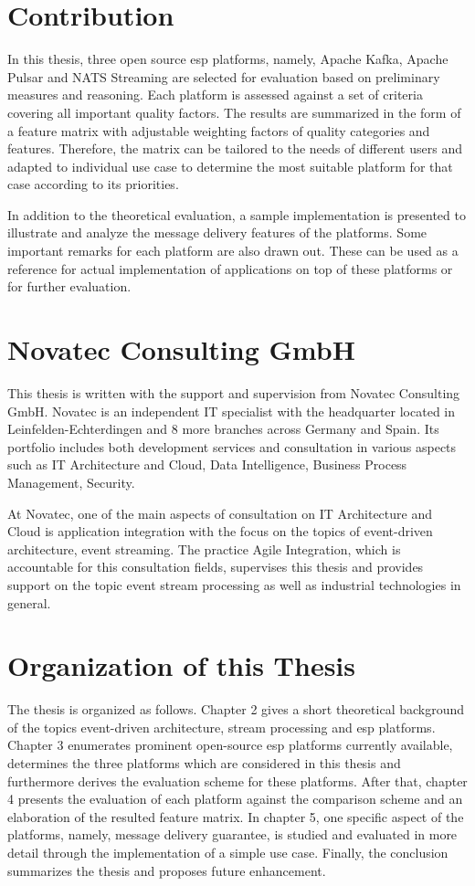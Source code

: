 \section{Contribution}
In this thesis, three open source \acrshort{esp} platforms, namely, Apache Kafka, Apache Pulsar and NATS Streaming are selected for evaluation based on preliminary measures and reasoning. Each platform is assessed against a set of criteria covering all important quality factors. The results are summarized in the form of a feature matrix with adjustable weighting factors of quality categories and features. Therefore, the matrix can be tailored to the needs of different users and adapted to individual use case to determine the most suitable platform for that case according to its priorities.

In addition to the theoretical evaluation, a sample implementation is presented to illustrate and analyze the message delivery features of the platforms. Some important remarks for each platform are also drawn out. These can be used as a reference for actual implementation of applications on top of these platforms or for further evaluation.
\section{Novatec Consulting GmbH}
This thesis is written with the support and supervision from Novatec Consulting GmbH. Novatec is an independent IT specialist with the headquarter located in Leinfelden-Echterdingen and 8 more branches across Germany and Spain. Its portfolio includes both development services and consultation in various aspects such as IT Architecture and Cloud, Data Intelligence, Business Process Management, Security.

At Novatec, one of the main aspects of consultation on IT Architecture and Cloud is application integration with the focus on the topics of event-driven architecture, event streaming. The practice Agile Integration, which is accountable for this consultation fields, supervises this thesis and provides support on the topic event stream processing as well as industrial technologies in general. 

\section{Organization of this Thesis}
The thesis is organized as follows. Chapter 2 gives a short theoretical background of the topics event-driven architecture, stream processing and \acrshort{esp} platforms. Chapter 3 enumerates prominent open-source \acrshort{esp} platforms currently available, determines the three platforms which are considered in this thesis and furthermore derives the evaluation scheme for these platforms. After that, chapter 4 presents the evaluation of each platform against the comparison scheme and an elaboration of the resulted feature matrix. In chapter 5, one specific aspect of the platforms, namely, message delivery guarantee, is studied and evaluated in more detail through the implementation of a simple use case. Finally, the conclusion summarizes the thesis and proposes future enhancement.

